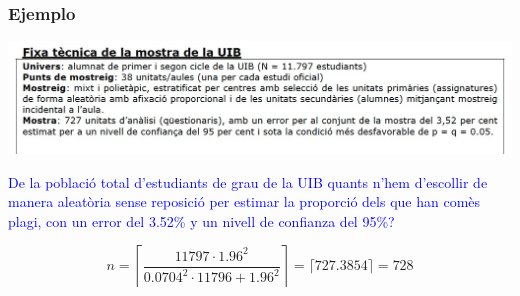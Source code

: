 \documentclass[12pt,t]{beamer}\usepackage[]{graphicx}\usepackage[]{color}
\newcommand{\blue}[1]{\textcolor{blue}{#1}}
\theoremstyle{plain}
\theoremstyle{definition}
\begin{document}
\begin{frame}
\frametitle{Ejemplo}
\vspace*{-5ex}

\begin{center}
\hspace*{-0.5cm}\includegraphics[width=1.1\linewidth]{plagiUIB2.jpg}
\end{center}

\blue{De la població total d'estudiants de grau de la UIB quants n'hem d'escollir de manera aleatòria sense reposició per estimar la proporció dels que han comès plagi, con un error del 3.52\% y un nivell de confianza  del 95\%?}
\pause

$$
n=\left\lceil\frac{11797\cdot 1.96^2}{0.0704^2\cdot 11796+1.96^2}\right\rceil=\lceil 727.3854\rceil=728
$$
\end{frame}
\end{document}
